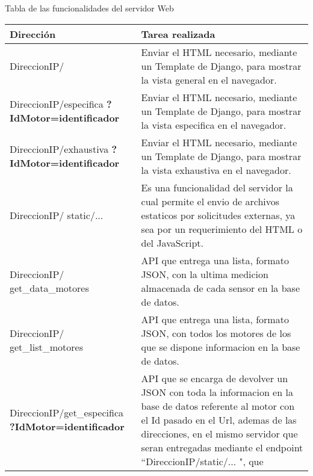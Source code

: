     \begin{table}[ht]
        \begin{center}
            Tabla de las funcionalidades del servidor Web   \\

            \vspace{0.3cm}
            \begin{tabular}{|p{5cm}|p{10cm}|}
                \hline
                Dirección       & Tarea realizada
                \\\hline\hline
                DireccionIP/ &
                Enviar el HTML necesario, mediante un Template de Django,
                para mostrar la vista general en el navegador.
                \\\hline
                DireccionIP/especifica \textbf{?IdMotor=identificador}&
                Enviar el HTML necesario, mediante un Template de Django,
                para mostrar la vista especifica en el navegador.
                \\\hline
                DireccionIP/exhaustiva \textbf{?IdMotor=identificador}  &
                Enviar el HTML necesario, mediante un Template de Django,
                para mostrar la vista exhaustiva en el navegador.
                \\\hline
                DireccionIP/ static/... &
                Es una funcionalidad del servidor la cual permite el envio de
                archivos estaticos por solicitudes externas, ya sea por un
                requerimiento del HTML o del JavaScript.
                \\\hline
                DireccionIP/ get\_data\_motores &
                API que entrega  una lista, formato JSON,
                con la ultima medicion almacenada de cada sensor en la base de
                datos.
                \\\hline
                DireccionIP/ get\_list\_motores &
                API que entrega una lista, formato JSON,
                con todos los motores de los que se
                dispone informacion en la base de datos.
                \\\hline
                DireccionIP/get\_especifica \textbf{?IdMotor=identificador}&
                API que se encarga de devolver un JSON con toda la informacion
                en la base de datos referente al motor con el Id pasado en el
                Url, ademas de las direcciones, en el mismo servidor que seran
                entregadas mediante el endpoint ``DireccionIP/static/... ", que

\end{tabular}
\end{center}
\end{table}
